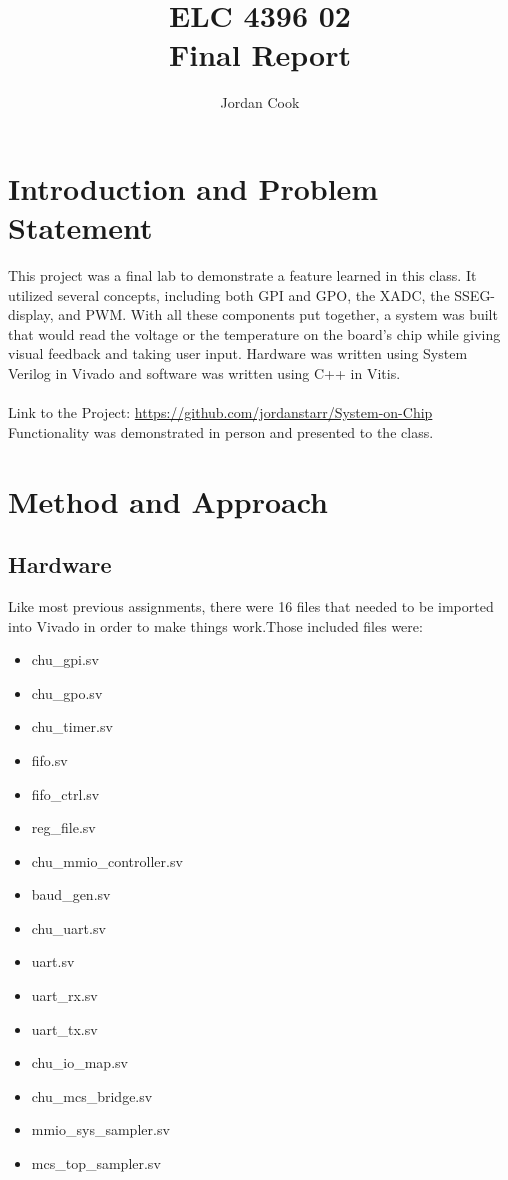 \documentclass[11pt]{article}
\begin{document}
\title{ELC 4396 02 \\ Final Report}
\author{Jordan Cook}

\maketitle


\section{Introduction and Problem Statement} 

\quad This project was a final lab to demonstrate a feature learned in this class. It utilized several concepts, including both GPI and GPO, the XADC, the SSEG-display, and PWM. With all these components put together, a system was built that would read the voltage or the temperature on the board's chip while giving visual feedback and taking user input. Hardware was written using System Verilog in Vivado and software was written using C++ in Vitis. 
\\\\ Link to the Project: \url{https://github.com/jordanstarr/System-on-Chip}
\\ Functionality was demonstrated in person and presented to the class. 

\section{Method and Approach}

\subsection{Hardware}

\quad Like most previous assignments, there were 16 files that needed to be imported into Vivado in order to make things work.Those included files were:  

\begin{multicols}{2}
\begin{itemize}
	\item chu\_gpi.sv
	\item chu\_gpo.sv 
	\item chu\_timer.sv 
	\item fifo.sv 
	\item fifo\_ctrl.sv 
	\item reg\_file.sv
	\item chu\_mmio\_controller.sv 
	\item baud\_gen.sv 
	\item chu\_uart.sv 
	\item uart.sv 
	\item uart\_rx.sv 
	\item uart\_tx.sv 
	\item chu\_io\_map.sv 
	\item chu\_mcs\_bridge.sv 
	\item mmio\_sys\_sampler.sv
	\item mcs\_top\_sampler.sv
\end{itemize}
\end{multicols} 
\end{document}
